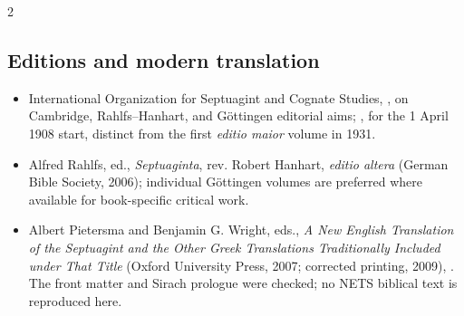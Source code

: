 \begin{multicols}{2}
\subsection*{Editions and modern translation}

{\footnotesize
\begin{itemize}[itemsep=0.1em,topsep=0.15em]
\item International Organization for Septuagint and Cognate Studies, , on Cambridge, Rahlfs--Hanhart, and G\"ottingen editorial aims; , for the 1 April 1908 start, distinct from the first \emph{editio maior} volume in 1931.
\item Alfred Rahlfs, ed., \emph{Septuaginta}, rev. Robert Hanhart, \emph{editio altera} (German Bible Society, 2006); individual G\"ottingen volumes are preferred where available for book-specific critical work.
\item Albert Pietersma and Benjamin G. Wright, eds., \emph{A New English Translation of the Septuagint and the Other Greek Translations Traditionally Included under That Title} (Oxford University Press, 2007; corrected printing, 2009), . The front matter and Sirach prologue were checked; no NETS biblical text is reproduced here.
\end{itemize}}

\end{multicols}
\endgroup
